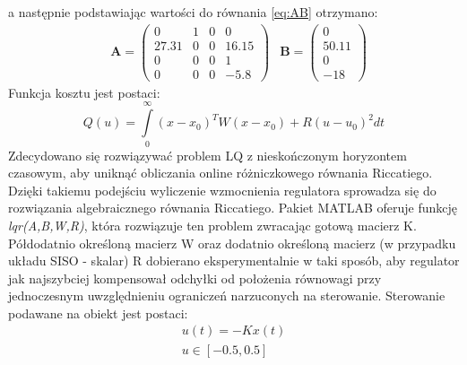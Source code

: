 a następnie podstawiając wartości do równania \ref{eq:AB} otrzymano:
\begin{equation}
\label{eq:ABwar}
\begin{aligned}
&\mathbf{A} =
\left( \begin{array}{cccc}
0 & 1 & 0 & 0 \\
27.31 & 0 & 0 & 16.15 \\
0 & 0 & 0 & 1 \\
0 & 0 & 0 & -5.8
\end{array} \right)
&\mathbf{B} =
\left( \begin{array}{cccc}
0 \\
50.11 \\
0 \\
-18
\end{array} \right)
\end{aligned}
\end{equation}
Funkcja kosztu jest postaci:
\begin{equation}
Q(u) = \int\limits_{0}^{\infty}  \left( x-x_{0}\right)^TW\left( x-x_{0}\right) + R\left( u-u_{0}\right)^2  dt
\label{eq:cost}  
\end{equation}
Zdecydowano się rozwiązywać problem LQ z nieskończonym horyzontem czasowym, aby uniknąć obliczania online różniczkowego równania Riccatiego. Dzięki takiemu podejściu wyliczenie wzmocnienia regulatora sprowadza się do rozwiązania algebraicznego równania Riccatiego. Pakiet MATLAB oferuje funkcję \textit{lqr(A,B,W,R)}, która rozwiązuje ten problem zwracając gotową macierz K. Półdodatnio określoną macierz W oraz dodatnio określoną macierz (w przypadku układu SISO - skalar) R dobierano eksperymentalnie w taki sposób, aby regulator jak najszybciej kompensował odchyłki od położenia równowagi przy jednoczesnym uwzględnieniu ograniczeń narzuconych na sterowanie. Sterowanie podawane na obiekt jest postaci:
\begin{eqnarray}
u(t) = -Kx(t)\\
u\in[-0.5, 0.5]    
\end{eqnarray}

